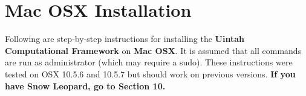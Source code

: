 \documentclass[12pt]{article}
\begin{document}


\section{Mac OSX Installation}

Following are step-by-step instructions for installing the
\textbf{Uintah Computational Framework} on \textbf{Mac OSX}.  It is
assumed that all commands are run as administrator (which may require
a sudo).  These instructions were tested on OSX 10.5.6 and 10.5.7 but
should work on previous versions.  \textbf{If you have Snow Leopard,
go to Section 10.}
\end{document}
